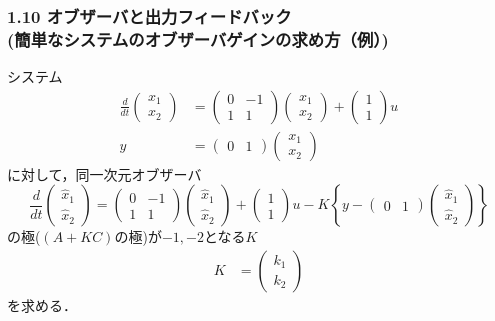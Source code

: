 \documentclass[10pt]{beamer}
\begin{document}
\begin{frame}[t]
\frametitle{1.10 オブザーバと出力フィードバック \\
(簡単なシステムのオブザーバゲインの求め方（例）)}
システム
\begin{align}
 \frac{d}{dt}
 \left(
 \begin{array}{c}
  x_1 \\
  x_2
 \end{array}
 \right)
 &=
 \left(
 \begin{array}{cc}
  0 & -1 \\
  1 & 1
 \end{array}
 \right)
 \left(
 \begin{array}{c}
  x_1 \\
  x_2
 \end{array}
 \right) +
 \left(
 \begin{array}{c}
  1 \\
  1
 \end{array}
 \right) u \\
 y &=
 \left(
 \begin{array}{cc}
  0 & 1
 \end{array}
 \right)
 \left(
 \begin{array}{c}
  x_1 \\
  x_2
 \end{array}
 \right)
\end{align}
に対して，同一次元オブザーバ
\begin{equation}
 \frac{d}{dt}
 \left(
 \begin{array}{c}
  \hat{x}_1 \\
  \hat{x}_2
 \end{array}
 \right)
 =
 \left(
 \begin{array}{cc}
  0 & -1 \\
  1 & 1
 \end{array}
 \right)
 \left(
 \begin{array}{c}
  \hat{x}_1 \\
  \hat{x}_2
 \end{array}
 \right) +
 \left(
 \begin{array}{c}
  1 \\
  1
 \end{array}
 \right) u -
 K\left\{y -
 \left(
 \begin{array}{cc}
  0 & 1
 \end{array}
 \right)
 \left(
 \begin{array}{c}
  \hat{x}_1 \\
  \hat{x}_2
 \end{array}
 \right)\right\}
\end{equation}
の極($(A+KC)$の極)が$-1, -2$となる$K$
\begin{align}
 K&=
 \left(
 \begin{array}{c}
  k_1 \\
  k_2
 \end{array}
 \right)
\end{align}
を求める．
\end{frame}
\end{document}
